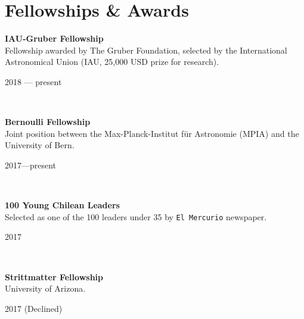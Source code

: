 \documentclass[11pt, a4paper]{article} %
\begin{document}
\section*{Fellowships \& Awards}

\begin{minipage}[t]{0.7\textwidth}
\begin{flushleft}%
  \setlength{\leftskip}{0.2cm}%
\textbf{IAU-Gruber Fellowship}\\
Fellowship awarded by The Gruber Foundation, selected by the International Astronomical Union (IAU, 25,000 USD prize for research).
\end{flushleft}
\end{minipage}
\begin{minipage}[t]{0.3\textwidth}
\hfill 2018 --- present
\end{minipage}\\

\begin{minipage}[t]{0.7\textwidth}
\begin{flushleft}%
  \setlength{\leftskip}{0.2cm}%
\textbf{Bernoulli Fellowship}\\
Joint position between the Max-Planck-Institut f\"ur Astronomie (MPIA) and the University of Bern.
\end{flushleft}
\end{minipage}
\begin{minipage}[t]{0.3\textwidth}
\hfill 2017---present
\end{minipage}\\

\begin{minipage}[t]{0.7\textwidth}
\begin{flushleft}%
  \setlength{\leftskip}{0.2cm}%
\textbf{100 Young Chilean Leaders}\\
Selected as one of the 100 leaders under 35 by \texttt{El Mercurio} newspaper.
\end{flushleft}
\end{minipage}
\begin{minipage}[t]{0.3\textwidth}
\hfill 2017
\end{minipage}\\

\begin{minipage}[t]{0.7\textwidth}
\begin{flushleft}%
  \setlength{\leftskip}{0.2cm}%
\textbf{Strittmatter Fellowship}\\
University of Arizona.
\end{flushleft}
\end{minipage}
\begin{minipage}[t]{0.3\textwidth}
\hfill 2017 (Declined)
\end{minipage}\\
\end{document}
